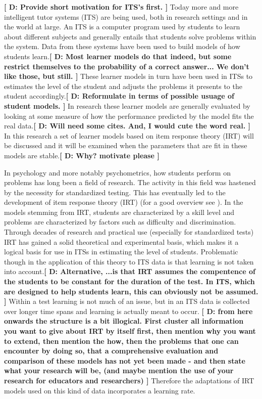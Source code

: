 \documentclass{scrartcl}
\providecommand{\comm}[1]{{\bf[ #1 ]}}
\providecommand{\commd}[1]{\comm{D: {#1}}}
\begin{document}
\commd{Provide short motivation for ITS's first.} Today more and more intelligent tutor systems (ITS) are being used, both in research settings and in the world at large. An ITS is a computer program used by students to learn about different subjects and generally entails that students solve problems within the system. Data from these systems have been used to build models of how students learn.\commd{Most learner models do that indeed, but some restrict themselves to the probability of a correct answer... We don't like those, but still.} These learner models in turn have been used in ITSs to estimates the level of the student and adjusts the problems it presents to the student accordingly.\commd{Reformulate in terms of possible usuage of student models.} In research these learner models are generally evaluated by looking at some measure of how the performance predicted by the model fits the real data.\commd{Will need some cites. And, I would cute the word real.} In this research a set of learner models based on item response theory (IRT) will be discussed and it will be examined when the parameters that are fit in these models are stable.\commd{Why? motivate please}

In psychology and more notably psychometrics, how students perform on problems has long been a field of research. The activity in this field was hastened by the necessity for standardized testing. This has eventually led to the development of item response theory (IRT) (for a good overview see \cite{hambleton}). In the models stemming from IRT, students are characterized by a skill level and problems are characterized by factors such as difficulty and discrimination. Through decades of research and practical use (especially for standardized tests) IRT has gained a solid theoretical and experimental basis, which makes it a logical basis for use in ITSs in estimating the level of students. Problematic though in the application of this theory to ITS data is that learning is not taken into account.\commd{Alternative, ...is that IRT assumes the compentence of the students to be constant for the duration of the test. In ITS, which are designed to help students learn, this can obviously not be assumed.} Within a test learning is not much of an issue, but in an ITS data is collected over longer time spans and learning is actually meant to occur. \commd{ from here onwards the structure is a bit illogical. First cluster all information you want to give about IRT by itself first, then mention why you want to extend, then mention the how, then the problems that one can encounter by doing so, that a comprehensive evaluation and comparison of these models has not yet been made - and then state what your research will be, (and maybe mention the use of your research for educators and researchers)} Therefore the adaptations of IRT models used on this kind of data incorporates a learning rate.
\end{document}
